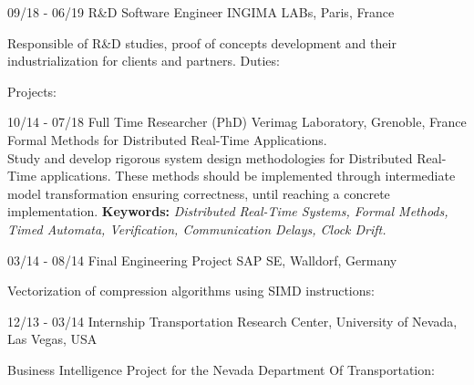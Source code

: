 \documentclass[]{friggeri-cv}
\begin{document}
\begin{entrylist}
  \entry
    {09/18 - 06/19}
    {R\&D Software Engineer}
    {INGIMA LABs, Paris, France}
    {Responsible of R\&D studies, proof of concepts development and their industrialization for clients and partners. Duties:
        \begin{itemize}
        \end{itemize}
        Projects:
        \begin{itemize}
        \end{itemize}
    }


  \entry
    {10/14 - 07/18}
    {Full Time Researcher (PhD)}
    {Verimag Laboratory, Grenoble, France}
    {Formal Methods for Distributed Real-Time Applications.\\
    Study and develop rigorous system design methodologies for Distributed Real-Time applications. These methods should be implemented through intermediate model transformation
    ensuring correctness, until reaching a concrete implementation.
    \newline \textbf{Keywords:} \emph{Distributed Real-Time Systems, Formal Methods, Timed Automata, Verification, Communication Delays, Clock Drift.}\\
  }

  \entry
    {03/14 - 08/14}
    {Final Engineering Project}
    {SAP SE, Walldorf, Germany}
    {Vectorization of compression algorithms using SIMD instructions:
        \begin{itemize}
        \end{itemize}
    }

  \entry
    {12/13 - 03/14}
    {Internship}
    {Transportation Research Center, University of Nevada, Las Vegas, USA}
    {Business Intelligence Project for the Nevada Department Of Transportation:
        \begin{itemize}
        \end{itemize}
    }
   
\end{entrylist}
\end{document}
